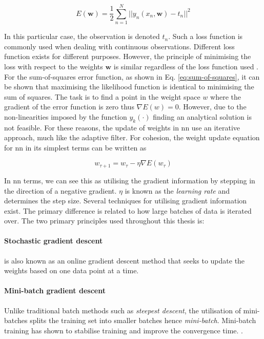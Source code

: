 \begin{equation}\label{eq:sum-of-squares}
  E(\mathbf{w}) = \frac{1}{2}\sum_{n=1}^N ||y_n(x_n,\mathbf{w}) - t_n ||^2
\end{equation}

In this particular case, the observation is denoted $t_n$. Such a loss function is commonly used when dealing with continuous observations. Different loss function exists for different purposes. However, the principle of minimising the loss with respect to the weights $\mathbf{w}$ is similar regardless of the loss function used \cite{M.Bishop2006}. For the sum-of-squares error function, as shown in Eq. \ref{eq:sum-of-squares}, it can be shown that maximising the likelihood function is identical to minimising the sum of squares. The task is to find a point in the weight space $w$ where the gradient of the error function is zero thus $\nabla E(w) = 0$. However, due to the non-linearities imposed by the function $y_k(\cdot)$ finding an analytical solution is not feasible. For these reasons, the update of weights in \gls{nn} use an iterative approach, much like the adaptive filter. For cohesion, the weight update equation for \gls{nn} in its simplest terms can be written as

\begin{equation}\label{eq:weight_update}
    w_{\tau + 1} = w_{\tau} - \eta \nabla E(w_{\tau})
\end{equation}

In \gls{nn} terms, we can see this as utilising the gradient information by stepping in the direction of a negative gradient. $\eta$ is known as the \emph{learning rate} and determines the step size. Several techniques for utilising gradient information exist. The primary difference is related to how large batches of data is iterated over. The two primary principles used throughout this thesis is:

\paragraph{Stochastic gradient descent}
is also known as an online gradient descent method that seeks to update the weights based on one data point at a time.

\paragraph{Mini-batch gradient descent}
Unlike traditional batch methods such as \emph{steepest descent}, the utilisation of mini-batches splits the training set into smaller batches hence \emph{mini-batch}. Mini-batch training has shown to stabilise training and improve the convergence time. \cite{Nielsen2015}.

